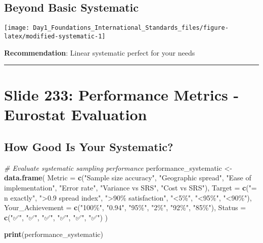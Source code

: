 \documentclass[
]{article}
\newenvironment{Shaded}{\begin{snugshade}}{\end{snugshade}}
\newcommand{\AttributeTok}[1]{\textcolor[rgb]{0.13,0.29,0.53}{#1}}
\newcommand{\CommentTok}[1]{\textcolor[rgb]{0.56,0.35,0.01}{\textit{#1}}}
\newcommand{\FunctionTok}[1]{\textcolor[rgb]{0.13,0.29,0.53}{\textbf{#1}}}
\newcommand{\NormalTok}[1]{#1}
\newcommand{\OtherTok}[1]{\textcolor[rgb]{0.56,0.35,0.01}{#1}}
\newcommand{\StringTok}[1]{\textcolor[rgb]{0.31,0.60,0.02}{#1}}
\begin{document}
\subsection{Beyond Basic Systematic}\label{beyond-basic-systematic}

\texttt{[image: Day1\_Foundations\_International\_Standards\_files/figure-latex/modified-systematic-1]}

\textbf{Recommendation}: Linear systematic perfect for your needs

\begin{center}\rule{0.5\linewidth}{0.5pt}\end{center}

\section{Slide 233: Performance Metrics - Eurostat
Evaluation}\label{slide-233-performance-metrics---eurostat-evaluation}

\subsection{How Good Is Your
Systematic?}\label{how-good-is-your-systematic}

\begin{Shaded}
\begin{Highlighting}[]
\CommentTok{\# Evaluate systematic sampling performance}
\NormalTok{performance\_systematic }\OtherTok{\textless{}{-}} \FunctionTok{data.frame}\NormalTok{(}
  \AttributeTok{Metric =} \FunctionTok{c}\NormalTok{(}\StringTok{"Sample size accuracy"}\NormalTok{, }\StringTok{"Geographic spread"}\NormalTok{, }
             \StringTok{"Ease of implementation"}\NormalTok{, }\StringTok{"Error rate"}\NormalTok{,}
             \StringTok{"Variance vs SRS"}\NormalTok{, }\StringTok{"Cost vs SRS"}\NormalTok{),}
  \AttributeTok{Target =} \FunctionTok{c}\NormalTok{(}\StringTok{"= n exactly"}\NormalTok{, }\StringTok{"\textgreater{}0.9 spread index"}\NormalTok{, }\StringTok{"\textgreater{}90\% satisfaction"}\NormalTok{,}
             \StringTok{"\textless{}5\%"}\NormalTok{, }\StringTok{"\textless{}95\%"}\NormalTok{, }\StringTok{"\textless{}90\%"}\NormalTok{),}
  \AttributeTok{Your\_Achievement =} \FunctionTok{c}\NormalTok{(}\StringTok{"100\%"}\NormalTok{, }\StringTok{"0.94"}\NormalTok{, }\StringTok{"95\%"}\NormalTok{, }\StringTok{"2\%"}\NormalTok{, }\StringTok{"92\%"}\NormalTok{, }\StringTok{"85\%"}\NormalTok{),}
  \AttributeTok{Status =} \FunctionTok{c}\NormalTok{(}\StringTok{"✅"}\NormalTok{, }\StringTok{"✅"}\NormalTok{, }\StringTok{"✅"}\NormalTok{, }\StringTok{"✅"}\NormalTok{, }\StringTok{"✅"}\NormalTok{, }\StringTok{"✅"}\NormalTok{)}
\NormalTok{)}

\FunctionTok{print}\NormalTok{(performance\_systematic)}
\end{Highlighting}
\end{Shaded}
\end{document}

